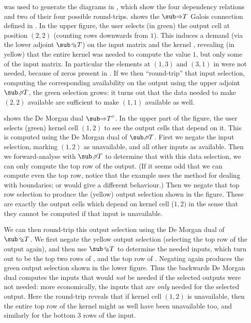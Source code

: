 \OurLanguage{} was used to generate the diagrams in , which show the four dependency relations and two of their four possible round-trips.  shows the $\evalGC{T}$ Galois connection defined in . In the upper figure, the user selects (in green) the output cell at position $(2,2)$ (counting rows downwards from $1$). This induces a demand (via the lower adjoint $\evalBwdF{T}$) on the input matrix  and the kernel , revealing (in yellow) that the entire kernel was needed to compute the value $1$, but only some of the input matrix. In particular the elements at $(1,3)$ and $(3,1)$ in  were not needed, because of zeros present in . If we then ``round-trip'' that input selection, computing the corresponding availability on the output using the upper adjoint $\evalFwdF{T}$, the green selection grows: it turns out that the data needed to make $(2,2)$ available are sufficient to make $(1,1)$ available as well.

 shows the De Morgan dual $\dual{\evalGC{T}}$. In the upper part of the figure, the user selects (green) kernel cell $(1, 2)$ to see the output cells that depend on it. This is computed using the De Morgan dual of $\evalFwdF{T}$. First we negate the input selection, marking $(1, 2)$ as unavailable, and all other inputs as available. Then we forward-analyse with $\evalFwdF{T}$ to determine that with this data selection, we can only compute the top row of the output. (If it seems odd that we can compute even the top row, notice that the example uses the method  for dealing with boundaries;  or  would give a different behaviour.) Then we negate that top row selection to produce the (yellow) output selection shown in the figure. These are exactly the output cells which depend on kernel cell ($1, 2)$ in the sense that they cannot be computed if that input is unavailable.

We can then round-trip this output selection using the De Morgan dual of $\evalBwdF{T}$. We first negate the yellow output selection (selecting the top row of the output again), and then use $\evalBwdF{T}$ to determine the needed inputs, which turn out to be the top two rows of , and the top row of . Negating again produces the green output selection shown in the lower figure. Thus the backwards De Morgan dual computes the inputs that would \emph{not} be needed if the selected outputs were not needed: more economically, the inputs that are \emph{only} needed for the selected output. Here the round-trip reveals that if kernel cell $(1, 2)$ is unavailable, then the entire top row of the kernel might as well have been unavailable too, and similarly for the bottom 3 rows of the input.

